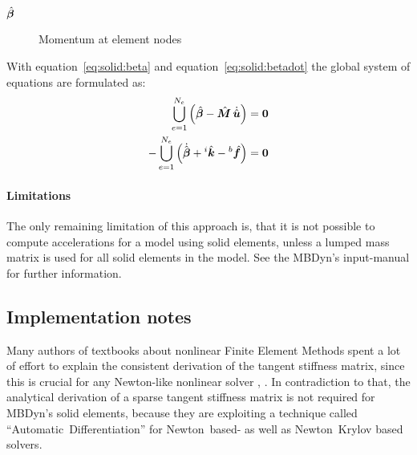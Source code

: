 \begin{description}
\item[$\hat{\bm{\beta}}$] Momentum at element nodes
\end{description}

With equation~\ref{eq:solid:beta} and equation~\ref{eq:solid:betadot} the global system of equations are formulated as:
\begin{eqnarray}
\bigcup_{e=1}^{N_e} \left(\hat{\bm{\beta}} - \hat{\bm{M}} \, \dot{\hat{\bm{u}}}\right) = \bm{0} \\
-\bigcup_{e=1}^{N_e} \left(\dot{\hat{\bm{\beta}}} + {^i}\hat{\bm{k}} - {^b}\hat{\bm{f}} \right) = \bm{0}
\end{eqnarray}

\paragraph{Limitations}
The only remaining limitation of this approach is, that it is not possible to compute accelerations
for a model using solid elements, unless a lumped mass matrix is used for all solid elements in the model.
See the MBDyn's input-manual for further information.

\subsection{Implementation notes}
Many authors of textbooks about nonlinear Finite Element Methods spent
a lot of effort to explain the consistent derivation of the tangent stiffness matrix,
since this is crucial for any Newton-like nonlinear solver \cite{WALLRAPP1998}, \cite{BATHE2016}.
In contradiction to that, the analytical derivation of a sparse tangent stiffness matrix is not required for MBDyn's solid elements,
because they are exploiting a technique called ``Automatic~Differentiation'' for Newton~based- as well as Newton~Krylov based solvers.
